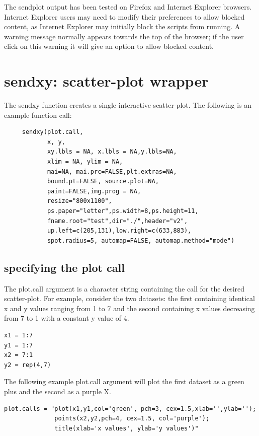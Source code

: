 \documentclass[]{article}
\begin{document}
\vskip5mm
 The sendplot output has been tested on Firefox and Internet Explorer browsers.  Internet Explorer users may need to modify their preferences to allow blocked content, as Internet Explorer may initially block the scripts from running. A warning message normally appears towards the top of the browser; if the user click on this warning it will give an option to allow blocked content.



\section{sendxy: scatter-plot wrapper}

The sendxy function creates a single interactive scatter-plot. The following is an example function call:
\begin{verbatim}
     sendxy(plot.call,
            x, y, 
            xy.lbls = NA, x.lbls = NA,y.lbls=NA,
            xlim = NA, ylim = NA,
            mai=NA, mai.prc=FALSE,plt.extras=NA,
            bound.pt=FALSE, source.plot=NA,
            paint=FALSE,img.prog = NA,
            resize="800x1100",
            ps.paper="letter",ps.width=8,ps.height=11,
            fname.root="test",dir="./",header="v2",
            up.left=c(205,131),low.right=c(633,883),
            spot.radius=5, automap=FALSE, automap.method="mode")
 \end{verbatim}


\subsection{specifying the plot call}
The plot.call argument is a character string containing the call for the desired scatter-plot. For example, consider the two datasets: the first containing identical x and y values ranging from 1 to 7 and the second containing x values decreasing from 7 to 1 with a constant y value of 4.

\begin{verbatim}
x1 = 1:7
y1 = 1:7  
x2 = 7:1
y2 = rep(4,7)
\end{verbatim}

The following example plot.call argument will plot the first dataset as a green plus and the second as a purple X. 

\begin{verbatim}
plot.calls = "plot(x1,y1,col='green', pch=3, cex=1.5,xlab='',ylab='');
              points(x2,y2,pch=4, cex=1.5, col='purple');
              title(xlab='x values', ylab='y values')"
\end{verbatim}
\end{document}
